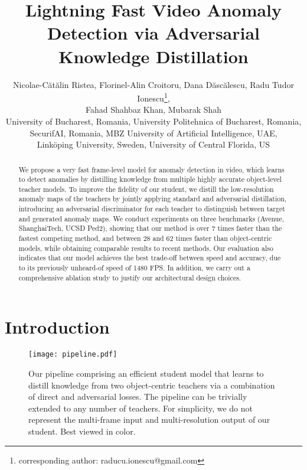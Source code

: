 \documentclass[10pt,twocolumn,letterpaper]{article}
\title{\vspace{-0.7cm}Lightning Fast Video Anomaly Detection via Adversarial Knowledge Distillation}
\author{Nicolae-C\u{a}t\u{a}lin Ristea, Florinel-Alin Croitoru, Dana D\u{a}sc\u{a}lescu, Radu Tudor Ionescu\thanks{corresponding author: raducu.ionescu@gmail.com}\;,\\ 
Fahad Shahbaz Khan, Mubarak Shah\\
University of Bucharest, Romania, University Politehnica of Bucharest, Romania,\\
SecurifAI, Romania, MBZ University of Artificial Intelligence, UAE,\\
Link\"{o}ping University, Sweden, University of Central Florida, US\vspace*{-0.3cm}
}
\begin{document}
\maketitle

\begin{abstract}
\vspace{-0.3cm}
We propose a very fast frame-level model for anomaly detection in video, which learns to detect anomalies by distilling knowledge from multiple highly accurate object-level teacher models. To improve the fidelity of our student, we distill the low-resolution anomaly maps of the teachers by jointly applying standard and adversarial distillation, introducing an adversarial discriminator for each teacher to distinguish between target and generated anomaly maps. 
We conduct experiments on three benchmarks (Avenue, ShanghaiTech, UCSD Ped2), showing that our method is over 7 times faster than the fastest competing method, and between 28 and 62 times faster than object-centric models, while obtaining comparable results to recent methods. Our evaluation also indicates that our model achieves the best trade-off between speed and accuracy, due to its previously unheard-of speed of 1480 FPS. In addition, we carry out a comprehensive ablation study to justify our architectural design choices. \vspace{-0.6cm}
\end{abstract}

\setlength{\abovedisplayskip}{3.0pt}
\setlength{\belowdisplayskip}{3.0pt}

\section{Introduction}

\begin{figure}[!t]
\begin{center}
\centerline{\texttt{[image: pipeline.pdf]}}
\vspace{-0.25cm}
\caption{Our pipeline comprising an efficient student model that learns to distill knowledge from two object-centric teachers via a combination of direct and adversarial losses. The pipeline can be trivially extended to any number of teachers. For simplicity, we do not represent the multi-frame input and multi-resolution output of our student. Best viewed in color.}
\label{fig_pipeline}
\vspace{-1.1cm}
\end{center}
\end{figure}
\end{document}
